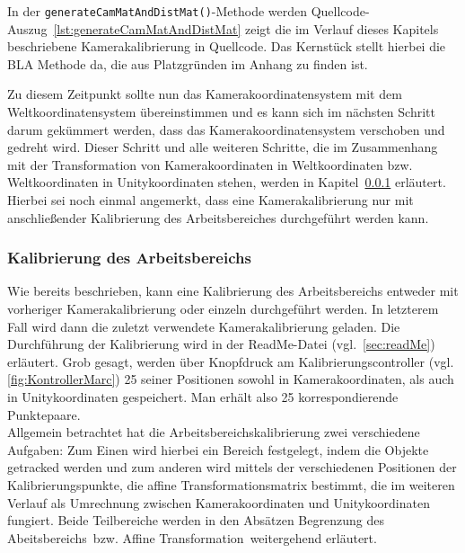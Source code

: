  

In der \texttt{generateCamMatAndDistMat()}-Methode werden    Quellcode-Auszug~\ref{lst:generateCamMatAndDistMat} zeigt die im Verlauf dieses Kapitels beschriebene Kamerakalibrierung in Quellcode. Das Kernstück stellt hierbei die BLA Methode da, die aus Platzgründen im Anhang zu finden ist. 

Zu diesem Zeitpunkt sollte nun das Kamerakoordinatensystem mit dem Weltkoordinatensystem übereinstimmen und es kann sich im nächsten Schritt darum gekümmert werden, dass das Kamerakoordinatensystem verschoben und gedreht wird. Dieser Schritt und alle weiteren Schritte, die im Zusammenhang mit der Transformation von Kamerakoordinaten in Weltkoordinaten bzw. Weltkoordinaten in Unitykoordinaten stehen, werden in Kapitel~\ref{sec:planeCalib} erläutert. Hierbei sei noch einmal angemerkt, dass eine Kamerakalibrierung nur mit anschließender Kalibrierung des Arbeitsbereiches durchgeführt werden kann.


\subsubsection{Kalibrierung des Arbeitsbereichs}\label{sec:planeCalib} 
Wie bereits beschrieben, kann eine Kalibrierung des Arbeitsbereichs entweder mit vorheriger Kamerakalibrierung oder einzeln durchgeführt werden. In letzterem Fall wird dann die zuletzt verwendete Kamerakalibrierung geladen. Die Durchführung der Kalibrierung wird in der ReadMe-Datei (vgl.~\ref{sec:readMe}) erläutert. Grob gesagt, werden über Knopfdruck am Kalibrierungscontroller (vgl. \ref{fig:KontrollerMarc}) 25 seiner Positionen sowohl in Kamerakoordinaten, als auch in Unitykoordinaten gespeichert. Man erhält also 25 korrespondierende Punktepaare.\\
Allgemein betrachtet hat die Arbeitsbereichskalibrierung zwei verschiedene Aufgaben: Zum Einen wird hierbei ein Bereich festgelegt, indem die Objekte getracked werden und zum anderen wird mittels der verschiedenen Positionen der Kalibrierungspunkte, die affine Transformationsmatrix bestimmt, die im weiteren Verlauf als Umrechnung zwischen Kamerakoordinaten und Unitykoordinaten fungiert. Beide Teilbereiche werden in den Absätzen \grqq Begrenzung des Abeitsbereichs\grqq ~bzw. \grqq Affine Transformation\grqq ~weitergehend erläutert.
	
